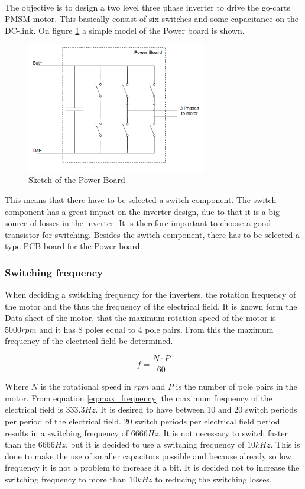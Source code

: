 \\
The objective is to design a two level three phase inverter to drive the go-carts PMSM motor. This basically consist of six switches and some capacitance on the DC-link. On figure \ref{fig:Sketch_PowerBoard} a simple model of the Power board is shown.

    \begin{figure}[H]
		\centering
		\includegraphics[width=0.7\textwidth]{pictures/hardware/Power_Board/Sketch_of_powerBoard.PNG}
		\caption{Sketch of the Power Board}
		\label{fig:Sketch_PowerBoard}
	\end{figure} 
	
This means that there have to be selected a switch component. The switch component has a great impact on the inverter design, due to that it is a big source of losses in the inverter. It is therefore important to choose a good transistor for switching. Besides the switch component, there has to be selected a type PCB board for the Power board.

\subsubsection{Switching frequency} \label{switching_frequency}
When deciding a switching frequency for the inverters, the rotation frequency of the motor and the thus the frequency of the electrical field.
It is known form the Data sheet of the motor, that the maximum rotation speed of the motor is $5000 rpm$ and it has 8 poles equal to 4 pole pairs. From this the maximum frequency of the electrical field be determined.

\begin{equation}
    f = \frac{N \cdot P}{60}
    \label{eq:max_frequency}
\end{equation}

Where $N$ is the rotational speed in $rpm$ and $P$ is the number of pole pairs in the motor.
From equation \ref{eq:max_frequency} the maximum frequency of the electrical field is $333.3 Hz$.
It is desired to have between 10 and 20 switch periods per period of the electrical field. 20 switch periods per electrical field period results in a switching frequency of $6666 Hz$. It is not necessary to switch faster than the $6666 Hz$, but it is decided to use a switching frequency of $10 kHz$. This is done to make the use of smaller capacitors possible and because already so low frequency it is not a problem to increase it a bit.
It is decided not to increase the switching frequency to more than $10 kHz$ to reducing the switching losses.


